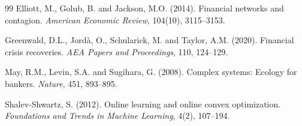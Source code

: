 \documentclass[11pt]{article}
\theoremstyle{definition}
\begin{document}
\begin{thebibliography}{99}
Elliott, M., Golub, B. and Jackson, M.O. (2014).
Financial networks and contagion.
\textit{American Economic Review}, 104(10), 3115--3153.

Greenwald, D.L., Jordà, O., Schularick, M. and Taylor, A.M. (2020).
Financial crisis recoveries.
\textit{AEA Papers and Proceedings}, 110, 124--129.

May, R.M., Levin, S.A. and Sugihara, G. (2008).
Complex systems: Ecology for bankers.
\textit{Nature}, 451, 893--895.

Shalev-Shwartz, S. (2012).
Online learning and online convex optimization.
\textit{Foundations and Trends in Machine Learning}, 4(2), 107--194.

\end{thebibliography}
\end{document}
